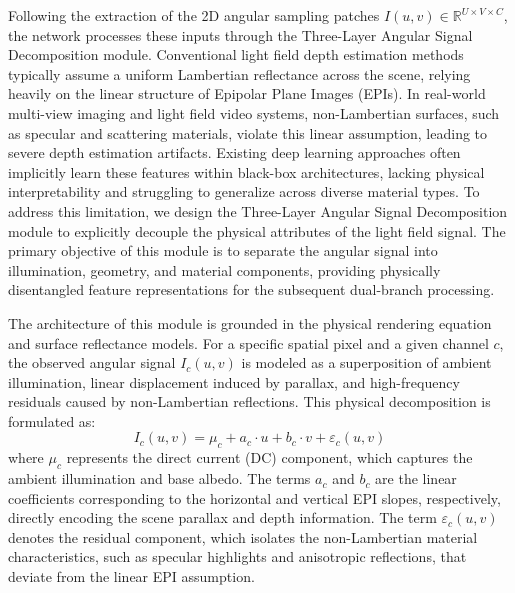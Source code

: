 \documentclass[lettersize,journal]{IEEEtran}
\begin{document}
Following the extraction of the 2D angular sampling patches $I(u,v) \in \mathbb{R}^{U \times V \times C}$, the network processes these inputs through the Three-Layer Angular Signal Decomposition module. Conventional light field depth estimation methods typically assume a uniform Lambertian reflectance across the scene, relying heavily on the linear structure of Epipolar Plane Images (EPIs). In real-world multi-view imaging and light field video systems, non-Lambertian surfaces, such as specular and scattering materials, violate this linear assumption, leading to severe depth estimation artifacts. Existing deep learning approaches often implicitly learn these features within black-box architectures, lacking physical interpretability and struggling to generalize across diverse material types. To address this limitation, we design the Three-Layer Angular Signal Decomposition module to explicitly decouple the physical attributes of the light field signal. The primary objective of this module is to separate the angular signal into illumination, geometry, and material components, providing physically disentangled feature representations for the subsequent dual-branch processing.

The architecture of this module is grounded in the physical rendering equation and surface reflectance models. For a specific spatial pixel and a given channel $c$, the observed angular signal $I_c(u,v)$ is modeled as a superposition of ambient illumination, linear displacement induced by parallax, and high-frequency residuals caused by non-Lambertian reflections. This physical decomposition is formulated as:
\begin{equation}
I_c(u,v) = \mu_c + a_c \cdot u + b_c \cdot v + \varepsilon_c(u,v)
\end{equation}
where $\mu_c$ represents the direct current (DC) component, which captures the ambient illumination and base albedo. The terms $a_c$ and $b_c$ are the linear coefficients corresponding to the horizontal and vertical EPI slopes, respectively, directly encoding the scene parallax and depth information. The term $\varepsilon_c(u,v)$ denotes the residual component, which isolates the non-Lambertian material characteristics, such as specular highlights and anisotropic reflections, that deviate from the linear EPI assumption.
\end{document}
